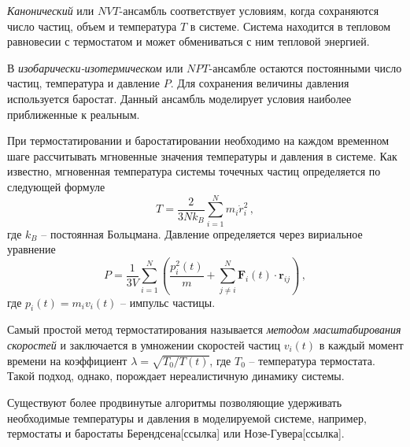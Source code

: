 \par \textit{Канонический} или $NVT$-ансамбль соответствует условиям, когда сохраняются число частиц, объем и температура $T$ в системе. Система находится в тепловом равновесии с термостатом и может обмениваться с ним тепловой энергией.

\par В \textit{изобарически-изотермическом} или $NPT$-ансамбле остаются постоянными число частиц, температура и давление $P$. Для сохранения величины давления используется баростат. Данный ансамбль моделирует условия наиболее приближенные к реальным.

При термостатировании и баростатировании необходимо на каждом временном шаге рассчитывать мгновенные значения температуры и давления в системе.
Как известно, мгновенная температура системы точечных частиц определяется по следующей формуле
\begin{equation}
    T = \dfrac{2}{3Nk_B}\sum\limits_{i=1}^{N}m_{i}\dot{r}_{i}^2\,,
    \label{eq2.4.1}
\end{equation}
где $k_B$ -- постоянная Больцмана.
Давление определяется через вириальное уравнение
\begin{equation}
    P = \dfrac{1}{3V}\sum\limits_{i=1}^N\left(\dfrac{p_i^2(t)}{m} +\sum\limits_{j\neq i}^{N}\mathbf{F}_{i}(t)\cdot\mathbf{r}_{ij}\right)\,,
    \label{eq2.4.2}
\end{equation}
где $p_i(t)=m_{i}v_i(t)$ -- импульс частицы.

Самый простой метод термостатирования называется \textit{методом масштабирования скоростей} и заключается в умножении скоростей частиц $v_i(t)$ в каждый момент времени на коэффициент $\lambda = \sqrt{T_0/T(t)}$, где $T_0$ -- температура термостата. Такой подход, однако, порождает нереалистичную динамику системы.

Существуют более продвинутые алгоритмы позволяющие удерживать необходимые температуры и давления в моделируемой системе, например, термостаты и баростаты Берендсена[ссылка] или Нозе-Гувера[ссылка].

